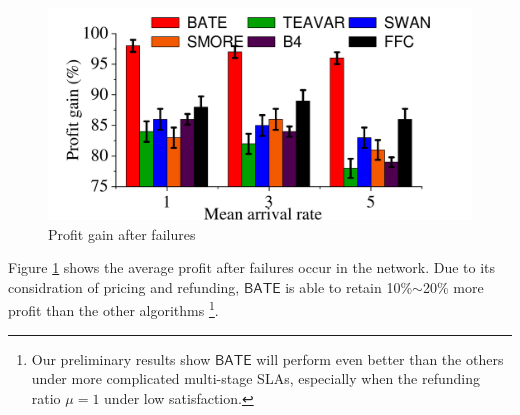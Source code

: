 \documentclass[sigconf]{acmart}
\begin{document}

\begin{figure}[t]
\begin{center}
\includegraphics [width=0.8\columnwidth] {fig/evaluation/sim-monney.pdf}
\caption{Profit gain after failures}
\label{sim-profit}
\end{center}
\end{figure}
Figure \ref{sim-profit} shows the average profit after failures occur in the network.
Due to its considration of pricing and refunding,  
$\mathsf{BATE}$ is able to retain 10\%$\sim$20\% more profit than the other algorithms
\footnote{Our preliminary results show $\mathsf{BATE}$ will perform even better than the others under more complicated multi-stage SLAs, especially when the refunding ratio $\mu=1$ under low satisfaction.}.
\end{document}

